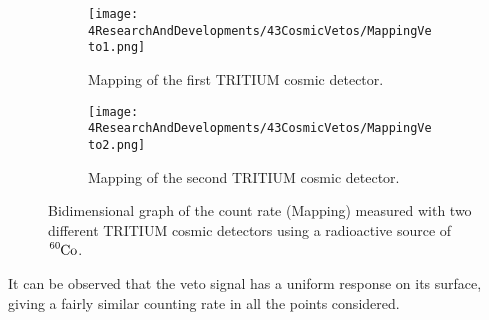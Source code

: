\begin{enumerate}

\begin{figure}
\centering
    \begin{subfigure}[b]{0.9\textwidth}
    \centering
    \texttt{[image: 4ResearchAndDevelopments/43CosmicVetos/MappingVeto1.png]}  
    \caption{Mapping of the first TRITIUM cosmic detector.\label{subfig:MappingVeto1}}
    \end{subfigure}
    \hfill
    \begin{subfigure}[b]{0.9\textwidth}
    \centering
    \texttt{[image: 4ResearchAndDevelopments/43CosmicVetos/MappingVeto2.png]}  
    \caption{Mapping of the second TRITIUM cosmic detector.\label{subfig:MappingVeto2}}
    \end{subfigure}
 \caption{Bidimensional graph of the count rate (Mapping) measured with two different TRITIUM cosmic detectors using a radioactive source of  $\ce{^{60}Co}$.}
 \label{fig:MappingVetos}
\end{figure}
It can be observed that the veto signal has a uniform response on its surface, giving a fairly similar counting rate in all the points considered.

\end{enumerate}

